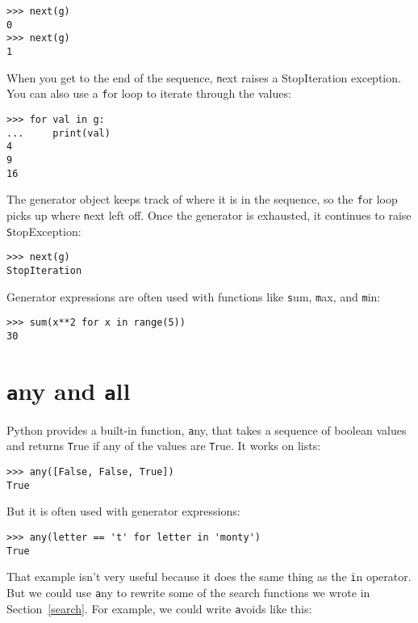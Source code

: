 \documentclass[
DIV=11,
fontsize=13,
twoside,
headinclude=false,
titlepage=firstiscover,
abstract=true,
headsepline=true,
footsepline=true,
chapterprefix=true, %
headings=big,
bibliography=totoc,%
captions=tableheading
]{scrbook}
\theoremstyle{definition}
\begin{document}
\begin{lstlisting}
>>> next(g)
0
>>> next(g)
1
\end{lstlisting}
%
When you get to the end of the sequence, {\texttt next} raises a 
StopIteration exception.  You can also use a {\texttt for} loop to iterate
through the values:

\begin{lstlisting}
>>> for val in g:
...     print(val)
4
9
16
\end{lstlisting}
%
The generator object keeps track of where it is in the sequence,
so the {\texttt for} loop picks up where {\texttt next} left off.  Once the
generator is exhausted, it continues to raise {\texttt StopException}:

\begin{lstlisting}
>>> next(g)
StopIteration
\end{lstlisting}

Generator expressions are often used with functions like {\texttt sum},
{\texttt max}, and {\texttt min}:

\begin{lstlisting}
>>> sum(x**2 for x in range(5))
30
\end{lstlisting}


\section{{\texttt any} and {\texttt all}}

Python provides a built-in function, {\texttt any}, that takes a sequence
of boolean values and returns {\texttt True} if any of the values are {\texttt
  True}.  It works on lists:

\begin{lstlisting}
>>> any([False, False, True])
True
\end{lstlisting}
%
But it is often used with generator expressions:

\begin{lstlisting}
>>> any(letter == 't' for letter in 'monty')
True
\end{lstlisting}
%
That example isn't very useful because it does the same thing
as the {\texttt in} operator.  But we could use {\texttt any} to rewrite
some of the search functions we wrote in Section~\ref{search}.  For
example, we could write {\texttt avoids} like this:
\end{document}
